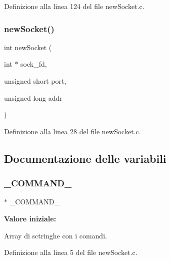 Definizione alla linea 124 del file new\+Socket.\+c.

\mbox{\label{a00038_aa205d529430076c7724f2c72f12dcb38}} 
\subsubsection{\texorpdfstring{newSocket()}{newSocket()}}
{\footnotesize\ttfamily int new\+Socket (\begin{DoxyParamCaption}\item[{int $\ast$}]{sock\+\_\+fd,  }\item[{unsigned short}]{port,  }\item[{unsigned long}]{addr }\end{DoxyParamCaption})}



Definizione alla linea 28 del file new\+Socket.\+c.



\subsection{Documentazione delle variabili}
\mbox{\label{a00038_abffef7bafd413aaa6ac4a8890404e461}} 
\subsubsection{\texorpdfstring{\_COMMAND\_}{\_COMMAND\_}}
{\footnotesize\ttfamily $\ast$ \+\_\+\+C\+O\+M\+M\+A\+N\+D\+\_\+}

{\bfseries Valore iniziale\+:}
\begin{DoxyCode}{0}
\DoxyCodeLine{=\{}
\DoxyCodeLine{    \textcolor{stringliteral}{"VER\_USER"},}
\DoxyCodeLine{    \textcolor{stringliteral}{"ADD\_USER"},}
\DoxyCodeLine{    \textcolor{stringliteral}{"RES\_FILE"},}
\DoxyCodeLine{    \textcolor{stringliteral}{"REQ\_FILE"},}
\DoxyCodeLine{\}}

\end{DoxyCode}


Array di sctringhe con i comandi. 



Definizione alla linea 5 del file new\+Socket.\+c.

